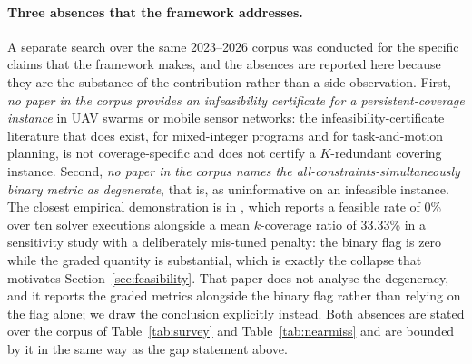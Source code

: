 \documentclass[conference]{IEEEtran}
\begin{document}
\paragraph{Three absences that the framework addresses.}
A separate search over the same 2023--2026 corpus was conducted for the specific claims that the framework makes, and the absences are reported here because they are the substance of the contribution rather than a side observation. First, \emph{no paper in the corpus provides an infeasibility certificate for a persistent-coverage instance} in UAV swarms or mobile sensor networks: the infeasibility-certificate literature that does exist, for mixed-integer programs and for task-and-motion planning, is not coverage-specific and does not certify a $K$-redundant covering instance. Second, \emph{no paper in the corpus names the all-constraints-simultaneously binary metric as degenerate}, that is, as uninformative on an infeasible instance. The closest empirical demonstration is in \cite{lee2026}, which reports a feasible rate of 0\% over ten solver executions alongside a mean $k$-coverage ratio of 33.33\% in a sensitivity study with a deliberately mis-tuned penalty: the binary flag is zero while the graded quantity is substantial, which is exactly the collapse that motivates Section~\ref{sec:feasibility}. That paper does not analyse the degeneracy, and it reports the graded metrics alongside the binary flag rather than relying on the flag alone; we draw the conclusion explicitly instead. Both absences are stated over the corpus of Table~\ref{tab:survey} and Table~\ref{tab:nearmiss} and are bounded by it in the same way as the gap statement above.
\end{document}
